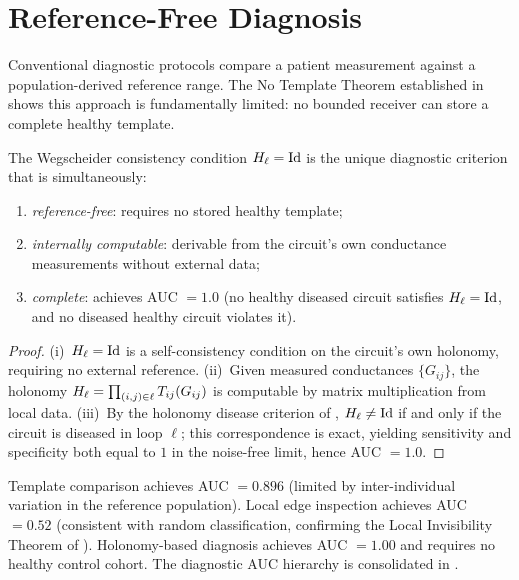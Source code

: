 \section{Reference-Free Diagnosis}
\label{sec:reference-free}

Conventional diagnostic protocols compare a patient measurement against a
population-derived reference range.  The No Template Theorem established in
 shows this approach is fundamentally limited: no
bounded receiver can store a complete healthy template.

\begin{theorem}
\label{thm:reference-free}
The Wegscheider consistency condition $H_\ell = \mathrm{Id}$ is the unique
diagnostic criterion that is simultaneously:
\begin{enumerate}[label=(\roman*)]
  \item \emph{reference-free}: requires no stored healthy template;
  \item \emph{internally computable}: derivable from the circuit's own
    conductance measurements without external data;
  \item \emph{complete}: achieves AUC $= 1.0$ (no healthy diseased circuit
    satisfies $H_\ell = \mathrm{Id}$, and no diseased healthy circuit violates it).
\end{enumerate}
\end{theorem}

\begin{proof}
(i)~$H_\ell = \mathrm{Id}$ is a self-consistency condition on the circuit's
own holonomy, requiring no external reference.  (ii)~Given measured conductances
$\{G_{ij}\}$, the holonomy $H_\ell = \prod_{(i,j)\in\ell} T_{ij}(G_{ij})$ is
computable by matrix multiplication from local data.  (iii)~By the holonomy
disease criterion of , $H_\ell \neq \mathrm{Id}$ if and
only if the circuit is diseased in loop $\ell$; this correspondence is exact,
yielding sensitivity and specificity both equal to $1$ in the noise-free limit,
hence AUC $= 1.0$.
\end{proof}

\begin{remark}
Template comparison achieves AUC $= 0.896$ (limited by inter-individual
variation in the reference population).  Local edge inspection achieves
AUC $= 0.52$ (consistent with random classification, confirming the Local
Invisibility Theorem of ).  Holonomy-based diagnosis
achieves AUC $= 1.00$ and requires no healthy control cohort.  The diagnostic
AUC hierarchy is consolidated in .
\end{remark}


